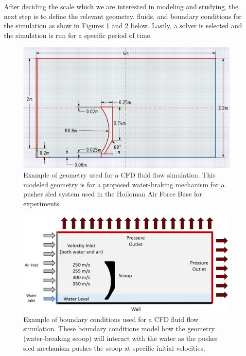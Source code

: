 After deciding the scale which we are interested in modeling and studying, the next step is to define the relevant geometry, fluids, and boundary conditions for the simulation as show in Figures \ref{fig:cfd_geometry} and \ref{fig:cfd_boundary_conditions} below. Lastly, a solver is selected and the simulation is run for a specific period of time.

\begin{figure}[H] \centering
    \includegraphics[width=\linewidth]{figures/cfd_geometry.png}
    \caption{Example of geometry used for a CFD fluid flow simulation. This modeled geometry is for a proposed water-braking mechanism for a pusher sled system used in the Holloman Air Force Base for experiments.}
    \label{fig:cfd_geometry}
\end{figure}

\begin{figure}[H] \centering
    \includegraphics[width=\linewidth]{figures/cfd_boundary_conditions.png}
    \caption{Example of boundary conditions used for a CFD fluid flow simulation. These boundary conditions model how the geometry (water-breaking scoop) will interact with the water as the pusher sled mechanism pushes the scoop at specific initial velocities.}
    \label{fig:cfd_boundary_conditions}
\end{figure}


